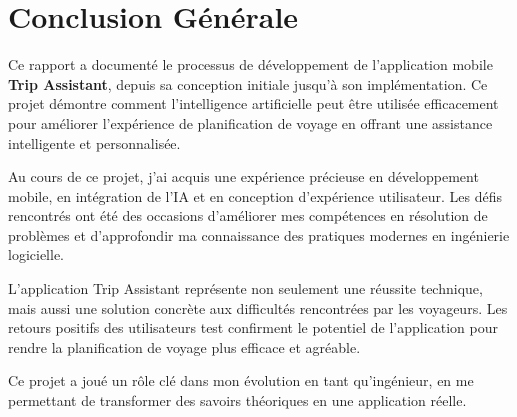\documentclass{rapportESPRIM}
\begin{document}
\clearpage

\chapter*{Conclusion Générale}
Ce rapport a documenté le processus de développement de l’application mobile \textbf{Trip Assistant}, depuis sa conception initiale jusqu’à son implémentation. Ce projet démontre comment l’intelligence artificielle peut être utilisée efficacement pour améliorer l’expérience de planification de voyage en offrant une assistance intelligente et personnalisée.

Au cours de ce projet, j’ai acquis une expérience précieuse en développement mobile, en intégration de l’IA et en conception d’expérience utilisateur. Les défis rencontrés ont été des occasions d’améliorer mes compétences en résolution de problèmes et d’approfondir ma connaissance des pratiques modernes en ingénierie logicielle.

L’application Trip Assistant représente non seulement une réussite technique, mais aussi une solution concrète aux difficultés rencontrées par les voyageurs. Les retours positifs des utilisateurs test confirment le potentiel de l’application pour rendre la planification de voyage plus efficace et agréable.

Ce projet a joué un rôle clé dans mon évolution en tant qu’ingénieur, en me permettant de transformer des savoirs théoriques en une application réelle.
\end{document}
